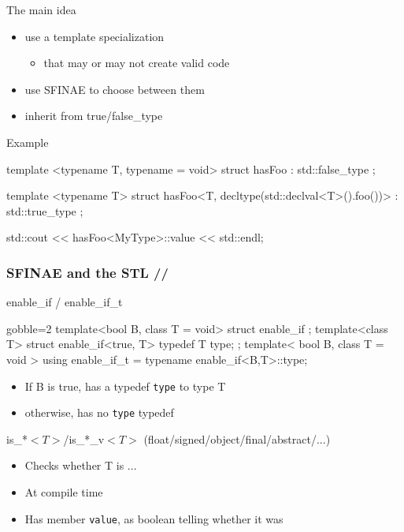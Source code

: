 \begin{frame}[fragile]
  \begin{block}{The main idea}
    \begin{itemize}
    \item use a template specialization
      \begin{itemize}
      \item that may or may not create valid code
      \end{itemize}
    \item use SFINAE to choose between them
    \item inherit from true/false\_type
    \end{itemize}
  \end{block}
  \begin{exampleblock}{Example}
    \begin{cppcode*}{}
      template <typename T, typename = void>
      struct hasFoo : std::false_type {};

      template <typename T>
      struct hasFoo<T, decltype(std::declval<T>().foo())>
        : std::true_type {};

      std::cout << hasFoo<MyType>::value << std::endl;
    \end{cppcode*}
  \end{exampleblock}  
\end{frame}

\begin{frame}[fragile]
  \frametitle{SFINAE and the STL \hfill {}//}
  \begin{block}{enable\_if / enable\_if\_t}
    \begin{cppcode*}{gobble=2}
      template<bool B, class T = void> struct enable_if {};
      template<class T>
      struct enable_if<true, T> { typedef T type; };
      template< bool B, class T = void >
      using enable_if_t = typename enable_if<B,T>::type;
    \end{cppcode*}
    \begin{itemize}
    \item If B is true, has a typedef \texttt{type} to type T
    \item otherwise, has no \texttt{type} typedef
    \end{itemize}
  \end{block}
  \begin{block}{is\_*$<T>$/is\_*\_v$<T>$ (float/signed/object/final/abstract/...)}
    \begin{itemize}
    \item Checks whether T is ...
    \item At compile time
    \item Has member \texttt{value}, as boolean telling whether it was
    \end{itemize}
  \end{block}
\end{frame}

